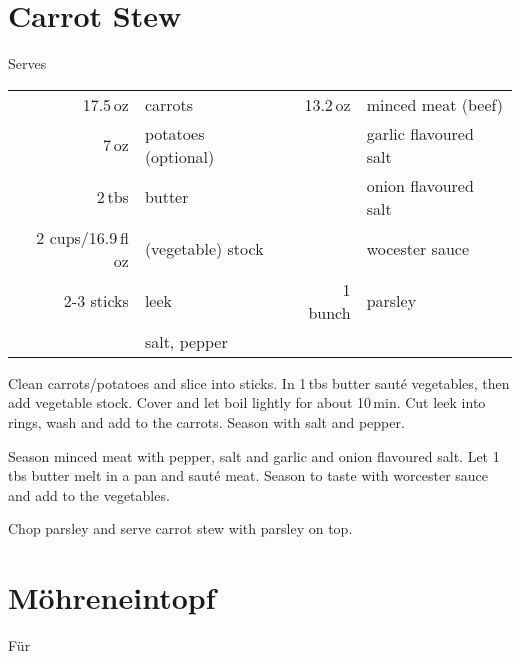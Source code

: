 \section{Carrot Stew}
\begin{centering}

Serves

\end{centering}

\begin{table}[H]
  \centering
    
  \begin{tabular*}{1\textwidth}{rlrl}
    17.5\,oz & carrots  & 13.2\,oz & minced meat (beef) \\
	7\,oz & potatoes (optional) & & garlic flavoured salt \\
	2\,tbs & butter & & onion flavoured salt\\
	2 cups/16.9\,fl oz & (vegetable) stock & & wocester sauce \\
	2-3 sticks & leek & 1 bunch & parsley \\
	& salt, pepper &  & \\
  \end{tabular*}
\end{table}

\begin{Notes}
\item Clean carrots/potatoes and slice into sticks. In 1\,tbs butter saut\'{e} vegetables, then add vegetable stock. Cover and let boil lightly for about 10\,min. Cut leek into rings, wash and add to the carrots. Season with salt and pepper.
\item Season minced meat with pepper, salt and garlic and onion flavoured salt. Let 1\,tbs butter melt in a pan and saut\'{e} meat. Season to taste with worcester sauce and add to the vegetables.
\item Chop parsley and serve carrot stew with parsley on top.
\end{Notes}


\section*{M\"{o}hreneintopf}

\begin{centering}

F\"{u}r

\end{centering}

